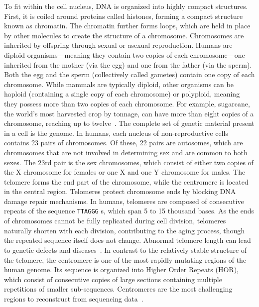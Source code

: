 To fit within the cell nucleus, DNA is organized into highly compact structures. First, it is coiled around proteins called histones, forming a compact structure known as chromatin. The chromatin further forms loops, which are held in place by other molecules to create the structure of a chromosome. Chromosomes are inherited by offspring through sexual or asexual reproduction. Humans are diploid organisms—meaning they contain two copies of each chromosome—one inherited from the mother (via the egg) and one from the father (via the sperm). Both the egg and the sperm (collectively called gametes) contain one copy of each chromosome. While mammals are typically diploid, other organisms can be haploid (containing a single copy of each chromosome) or polyploid, meaning they possess more than two copies of each chromosome. For example, sugarcane, the world's most harvested crop by tonnage, can have more than eight copies of a chromosome, reaching up to twelve~\cite{sugarcane}.
The complete set of genetic material present in a cell is the genome. In humans, each nucleus of non-reproductive cells contains 23 pairs of chromosomes. Of these, 22 pairs are autosomes, which are chromosomes that are not involved in determining sex and are common to both sexes. The 23rd pair is the sex chromosomes, which consist of either two copies of the X chromosome for females or one X and one Y chromosome for males. The telomere forms the end part of the chromosome, while the centromere is located in the central region. Telomeres protect chromosome ends by blocking DNA damage repair mechanisms. In humans, telomeres are composed of consecutive repeats of the sequence \texttt{TTAGGG} s, which span 5 to 15 thousand bases. As the ends of chromosomes cannot be fully replicated during cell division, telomeres naturally shorten with each division, contributing to the aging process, though the repeated sequence itself does not change. Abnormal telomere length can lead to genetic defects and diseases~\cite{telomeres}. In contrast to the relatively stable structure of the telomere, the centromere is one of the most rapidly mutating regions of the human genome. Its sequence is organized into Higher Order Repeats (\gls{HOR}), which consist of consecutive copies of large sections containing multiple repetitions of smaller sub-sequences. Centromeres are the most challenging regions to reconstruct from sequencing data~\cite{centromeres}.

